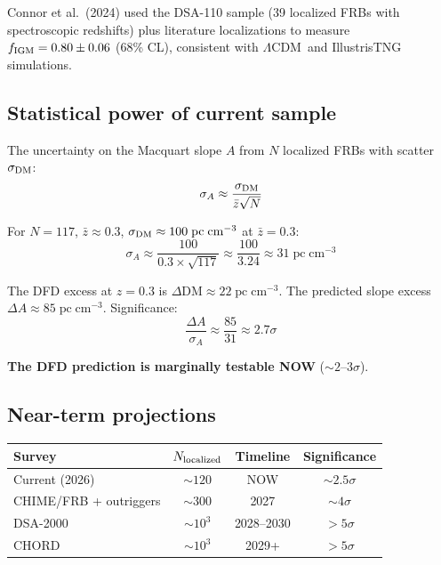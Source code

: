 \documentclass[11pt]{article}
\newcommand{\LCDM}{$\Lambda$CDM}
\newcommand{\fIGM}{f_{\rm IGM}}
\newcommand{\pc}{\;\mathrm{pc\;cm}^{-3}}
\begin{document}
Connor et al.\ (2024) used the DSA-110 sample (39 localized FRBs
with spectroscopic redshifts) plus literature localizations to
measure $\fIGM = 0.80 \pm 0.06$ (68\% CL), consistent with \LCDM\
and IllustrisTNG simulations.

\subsection{Statistical power of current sample}

The uncertainty on the Macquart slope $A$ from $N$ localized FRBs
with scatter $\sigma_{\rm DM}$:
\begin{equation}
\sigma_A \approx \frac{\sigma_{\rm DM}}{\bar{z}\sqrt{N}}
\end{equation}

For $N = 117$, $\bar{z} \approx 0.3$, $\sigma_{\rm DM} \approx
100\pc$ at $\bar{z} = 0.3$:
\begin{equation}
\sigma_A \approx \frac{100}{0.3 \times \sqrt{117}}
\approx \frac{100}{3.24}
\approx 31\pc
\end{equation}

The DFD excess at $z = 0.3$ is $\Delta\mathrm{DM} \approx 22\pc$.
The predicted slope excess $\Delta A \approx 85\pc$.  Significance:
\begin{equation}
\frac{\Delta A}{\sigma_A} \approx \frac{85}{31} \approx 2.7\sigma
\end{equation}

\textbf{The DFD prediction is marginally testable NOW} ($\sim 2$--$3\sigma$).

\subsection{Near-term projections}

\begin{center}
\small
\begin{tabular}{lccc}
\toprule
\textbf{Survey} & $N_{\rm localized}$ & \textbf{Timeline} & \textbf{Significance} \\
\midrule
Current (2026) & $\sim 120$ & NOW & $\sim 2.5\sigma$ \\
CHIME/FRB + outriggers & $\sim 300$ & 2027 & $\sim 4\sigma$ \\
DSA-2000 & $\sim 10^3$ & 2028--2030 & $> 5\sigma$ \\
CHORD & $\sim 10^3$ & 2029+ & $> 5\sigma$ \\
\bottomrule
\end{tabular}
\end{center}
\end{document}
